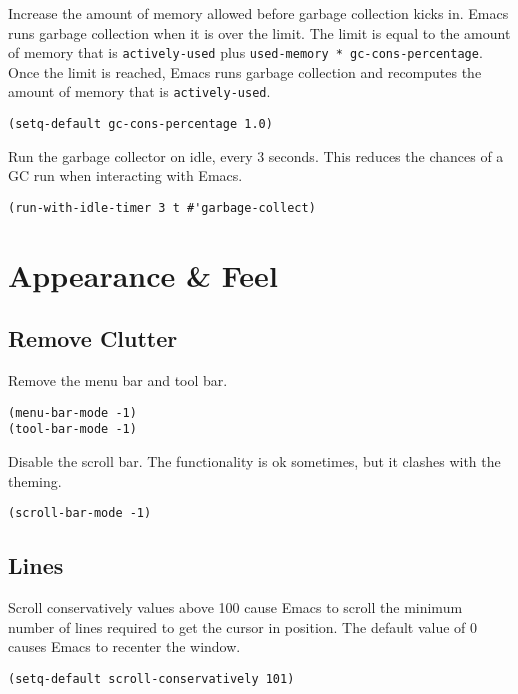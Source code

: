 \documentclass[11pt]{article}
\begin{document}
Increase the amount of memory allowed before garbage collection kicks in. Emacs
runs garbage collection when it is over the limit. The limit is equal to the
amount of memory that is \texttt{actively-used} plus \texttt{used-memory *
gc-cons-percentage}. Once the limit is reached, Emacs runs garbage collection
and recomputes the amount of memory that is \texttt{actively-used}.

\begin{verbatim}
(setq-default gc-cons-percentage 1.0)
\end{verbatim}

Run the garbage collector on idle, every 3 seconds. This reduces the chances of
a GC run when interacting with Emacs.

\begin{verbatim}
(run-with-idle-timer 3 t #'garbage-collect)
\end{verbatim}
\section{Appearance \& Feel}
\label{sec:org2e5e82e}

\subsection{Remove Clutter}
\label{sec:orgd8c70e6}

Remove the menu bar and tool bar.

\begin{verbatim}
(menu-bar-mode -1)
(tool-bar-mode -1)
\end{verbatim}

Disable the scroll bar. The functionality is ok sometimes, but it clashes with
the theming.

\begin{verbatim}
(scroll-bar-mode -1)
\end{verbatim}
\subsection{Lines}
\label{sec:org260742e}

Scroll conservatively values above 100 cause Emacs to scroll the
minimum number of lines required to get the cursor in position. The
default value of 0 causes Emacs to recenter the window.

\begin{verbatim}
(setq-default scroll-conservatively 101)
\end{verbatim}
\end{document}
